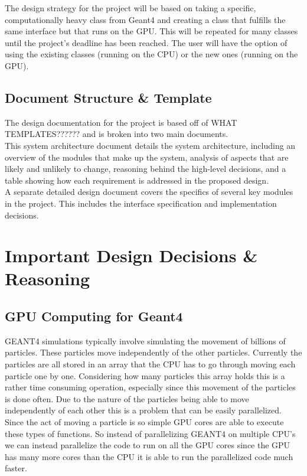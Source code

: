 \documentclass[12pt]{article}
\begin{document}
The design strategy for the project will be based on taking a specific, computationally heavy class from Geant4 and creating a class that fulfills the same interface but that runs on the GPU. This will be repeated for many classes until the project's deadline has been reached. The user will have the option of using the existing classes (running on the CPU) or the new ones (running on the GPU).

\subsection{Document Structure \& Template}
The design documentation for the project is based off of WHAT TEMPLATES?????? and is broken into two main documents.\\

This system architecture document details the system architecture, including an overview of the modules that make up the system, analysis of aspects that are likely and unlikely to change, reasoning behind the high-level decisions, and a table showing how each requirement is addressed in the proposed design.\\

A separate detailed design document covers the specifics of several key modules in the project. This includes the interface specification and implementation decisions.

\section{Important Design Decisions \& Reasoning}
\subsection{GPU Computing for Geant4}
GEANT4 simulations typically involve simulating the movement of billions of particles. These particles move independently of the other particles. Currently the particles are all stored in an array that the CPU has to go through moving each particle one by one. Considering how many particles this array holds this is a rather time consuming operation, especially since this movement of the particles is done often. 
Due to the nature of the particles being able to move independently of each other this is a problem that can be easily parallelized. Since the act of moving a particle is so simple GPU cores are able to execute these types of functions. So instead of parallelizing GEANT4 on multiple CPU's we can instead parallelize the code to run on all the GPU cores since the GPU has many more cores than the CPU it is able to run the parallelized code much faster.
\end{document}
